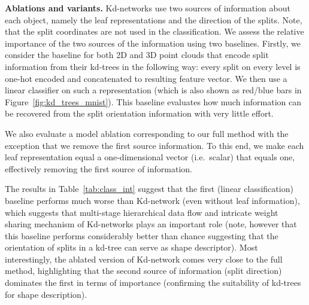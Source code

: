 \documentclass[10pt,twocolumn,letterpaper]{article}
\newcommand{\fig}[1]{Figure~\ref{fig:#1}}
\newcommand{\tab}[1]{Table~\ref{tab:#1}}
\begin{document}
\textbf{Ablations and variants.} Kd-networks use two sources of information about each object, namely the leaf representations and the direction of the splits. Note, that the split coordinates are not used in the classification. We assess the relative importance of the two sources of the information using two baselines. Firstly, we consider the baseline for both 2D and 3D point clouds that encode split information from their kd-trees in the following way: every split on every level is one-hot encoded and concatenated to resulting feature vector. We then use a linear classifier on such a representation (which is also shown as red/blue bars in \fig{kd_trees_mnist}). This baseline evaluates how much information can be recovered from the split orientation information with very little effort.

We also evaluate a model ablation corresponding to our full method with the exception that we remove the first source information. To this end, we make each leaf representation equal a one-dimensional vector (i.e.\ scalar) that equals one, effectively removing the first source of information.

The results in \tab{class_int} suggest that the first (linear classification) baseline performs much worse than Kd-network (even without leaf information), which suggests that multi-stage hierarchical data flow and intricate weight sharing mechanism of Kd-networks plays an important role (note, however that this baseline performs considerably better than chance suggesting that the orientation of splits in a kd-tree can serve as shape descriptor). Most interestingly, the ablated version of Kd-network comes very close to the full method, highlighting that the second source of information (split direction) dominates the first in terms of importance (confirming the suitability of kd-trees for shape description). 
\end{document}
